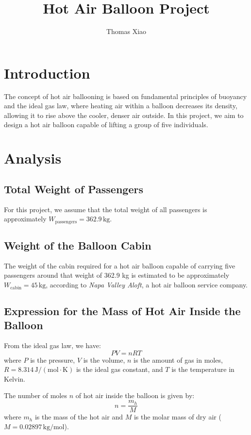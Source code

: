 \documentclass{article}
\title{Hot Air Balloon Project}
\author{Thomas Xiao}
\date{}
\begin{document}
\maketitle

\section*{Introduction}
The concept of hot air ballooning is based on fundamental principles of buoyancy and the ideal gas law, where heating air within a balloon decreases its density, allowing it to rise above the cooler, denser air outside. In this project, we aim to design a hot air balloon capable of lifting a group of five individuals. 

\section*{Analysis}

\subsection*{Total Weight of Passengers}
For this project, we assume that the total weight of all passengers is approximately \( W_{\text{passengers}} = 362.9 \, \text{kg} \).

\subsection*{Weight of the Balloon Cabin}
The weight of the cabin required for a hot air balloon capable of carrying five passengers around that weight of 362.9  kg is estimated to be approximately \( W_{\text{cabin}} = 45 \, \text{kg} \), according to \textit{Napa Valley Aloft}, a hot air balloon service company.





\subsection*{Expression for the Mass of Hot Air Inside the Balloon}
From the ideal gas law, we have:
\[
PV = nRT
\]
where $P$ is the pressure, $V$ is the volume, $n$ is the amount of gas in moles, $R = 8.314 \, \mathrm{J/(mol \cdot K)}$ is the ideal gas constant, and $T$ is the temperature in Kelvin.

The number of moles $n$ of hot air inside the balloon is given by:
\[
n = \frac{m_h}{M}
\]
where $m_h$ is the mass of the hot air and $M$ is the molar mass of dry air ($M = 0.02897 \, \mathrm{kg/mol}$).
\end{document}
